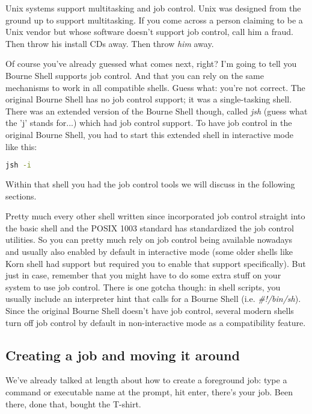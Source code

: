 Unix systems support multitasking and job control. Unix was designed from the
ground up to support multitasking. If you come across a person claiming to be a
Unix vendor but whose software doesn't support job control, call him a fraud.
Then throw his install CDs away. Then throw \textit{him} away.

Of course you've already guessed what comes next, right? I'm going to tell you
Bourne Shell supports job control. And that you can rely on the same mechanisms
to work in all compatible shells. Guess what: you're not correct. The original
Bourne Shell has no job control support; it was a single-tasking shell. There
was an extended version of the Bourne Shell though, called \textit{jsh} (guess
what the 'j' stands for...) which had job control support. To have job control
in the original Bourne Shell, you had to start this extended shell in
interactive mode like this:
\lstset{basicstyle=\scriptsize, numbers=left, captionpos=b, tabsize=4}
\begin{lstlisting}[language={bash},
xleftmargin=15pt]
jsh -i
\end{lstlisting}

Within that shell you had the job control tools we will discuss in the
following sections.

Pretty much every other shell written since incorporated job control straight
into the basic shell and the POSIX 1003 standard has standardized the job
control utilities. So you can pretty much rely on job control being available
nowadays and usually also enabled by default in interactive mode (some older
shells like Korn shell had support but required you to enable that support
specifically). But just in case, remember that you might have to do some extra
stuff on your system to use job control. There is one gotcha though: in shell
scripts, you usually include an interpreter hint that calls for a Bourne Shell
(i.e. \textit{\#!/bin/sh}). Since the original Bourne Shell doesn't have job
control, several modern shells turn off job control by default in
non-interactive mode as a compatibility feature.

\subsection{Creating a job and moving it around}
We've already talked at length about how to create a foreground job: type a
command or executable name at the prompt, hit enter, there's your job. Been
there, done that, bought the T-shirt.

